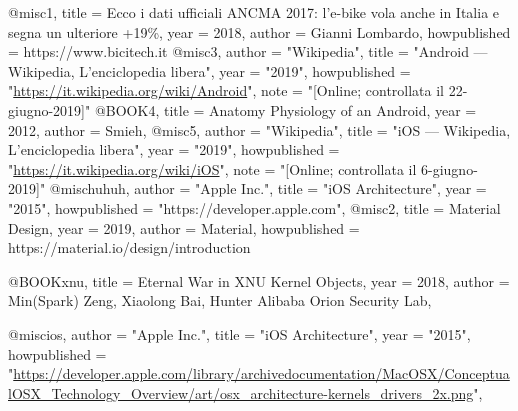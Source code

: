 @misc{1,
title = {Ecco i dati ufficiali ANCMA 2017: l’e-bike vola anche in Italia e segna un ulteriore +19\%},
year = {2018},
author = {Gianni Lombardo},
howpublished = {https://www.bicitech.it}
}
@misc{3,
  author = "Wikipedia",
  title = "Android --- Wikipedia{,} L'enciclopedia libera",
  year = "2019",
  howpublished = "\url{https://it.wikipedia.org/wiki/Android}",
  note = "[Online; controllata il 22-giugno-2019]"
}
@BOOK{4,
title = {Anatomy Physiology of an Android},
year = {2012},
author = {Smieh},
}
@misc{5,
  author = "Wikipedia",
  title = "iOS --- Wikipedia{,} L'enciclopedia libera",
  year = "2019",
  howpublished = "\url{https://it.wikipedia.org/wiki/iOS}",
  note = "[Online; controllata il 6-giugno-2019]"
}
@misc{huhuh,
  author = "Apple Inc.",
  title = "iOS Architecture",
  year = "2015",
  howpublished = "https://developer.apple.com", 
}
@misc{2,
title = {Material Design},
year = {2019},
author = {Material},
howpublished = {https://material.io/design/introduction}
}

@BOOK{xnu,
title = {Eternal War in XNU Kernel Objects},
year = {2018},
author = {Min(Spark) Zeng, Xiaolong Bai, Hunter Alibaba Orion Security Lab},
}	

@misc{ios,
  author = "Apple Inc.",
  title = "iOS Architecture",
  year = "2015",
  howpublished = "\url{https://developer.apple.com/library/archivedocumentation/MacOSX/ConceptualOSX_Technology_Overview/art/osx_architecture-kernels_drivers_2x.png}",  
}